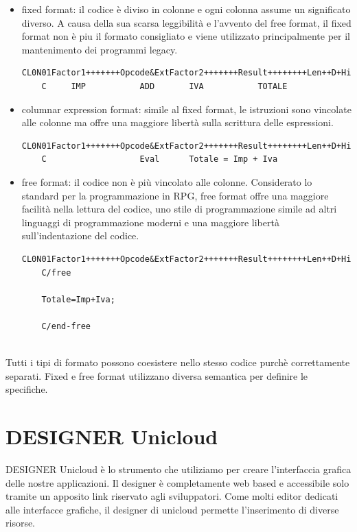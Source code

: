 \documentclass[target=bach,aauheader=,style=]{thud}
\begin{document}
\begin{itemize}
    \item fixed format: il codice è diviso in colonne e ogni colonna assume un significato diverso.
    A causa della sua scarsa leggibilità e l'avvento del free format, il fixed format non è piu il formato consigliato e viene utilizzato principalmente per il mantenimento dei programmi legacy.
    \begin{lstlisting}[language=RPG, caption=Codice RPG in fixed format, label=lst:rpgfixed]
    CL0N01Factor1+++++++Opcode&ExtFactor2+++++++Result++++++++Len++D+HiLoEq...
    C     IMP           ADD       IVA           TOTALE
    \end{lstlisting}
    \item columnar expression format: simile al fixed format, le istruzioni sono vincolate alle colonne ma offre una maggiore libertà sulla scrittura delle espressioni.
    \begin{lstlisting}[language=RPG, caption=Codice RPG in columnar expression format, label=lst:rpgcolumnar]
    CL0N01Factor1+++++++Opcode&ExtFactor2+++++++Result++++++++Len++D+HiLoEq...
    C                   Eval      Totale = Imp + Iva
    \end{lstlisting}
    \item free format: il codice non è più vincolato alle colonne. Considerato lo standard per la programmazione in RPG, free format offre una maggiore facilità nella lettura del codice, uno stile di programmazione simile ad altri linguaggi di programmazione moderni e una maggiore libertà sull'indentazione del codice.
    \begin{lstlisting}[language=RPG, caption=Codice RPG in free format, label=lst:rpgfree]
    CL0N01Factor1+++++++Opcode&ExtFactor2+++++++Result++++++++Len++D+HiLoEq...
    C/free

    Totale=Imp+Iva;

    C/end-free
    
    \end{lstlisting}
     
\end{itemize} 

Tutti i tipi di formato possono coesistere nello stesso codice purchè correttamente separati.
Fixed e free format utilizzano diversa semantica per definire le specifiche.

\section{DESIGNER Unicloud}
DESIGNER Unicloud è lo strumento che utiliziamo per creare l'interfaccia grafica delle nostre applicazioni.
Il designer è completamente web based e accessibile solo tramite un apposito link riservato agli sviluppatori.
Come molti editor dedicati alle interfacce grafiche, il designer di unicloud permette l'inserimento di diverse risorse.
\end{document}
